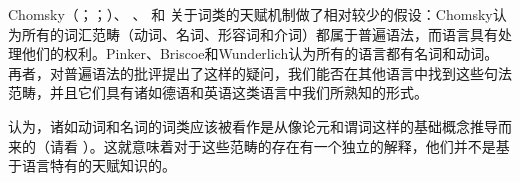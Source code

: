 Chomsky（\citeyear[]{Chomsky88a-u}；\citeyear{Chomsky91a-u}；\citeyear[]{Chomsky95a-u}）、 \citet[, 286]{Pinker94a}、 \citet[]{Briscoe2000a}和 \citet[]{Wunderlich2004a}关于词类的天赋机制做了相对较少的假设：Chomsky认为所有的词汇范畴（动词、名词、形容词和介词）都属于普遍语法，而语言具有处理他们的权利。Pinker、Briscoe和Wunderlich认为所有的语言都有名词和动词。再者，对普遍语法的批评提出了这样的疑问，我们能否在其他语言中找到这些句法范畴，并且它们具有诸如德语和英语这类语言中我们所熟知的形式。

 \citet[]{Braine87a}认为，诸如动词和名词的词类应该被看作是从像论元和谓词这样的基础概念推导而来的（请看 ）。这就意味着对于这些范畴的存在有一个独立的解释，他们并不是基于语言特有的天赋知识的。

